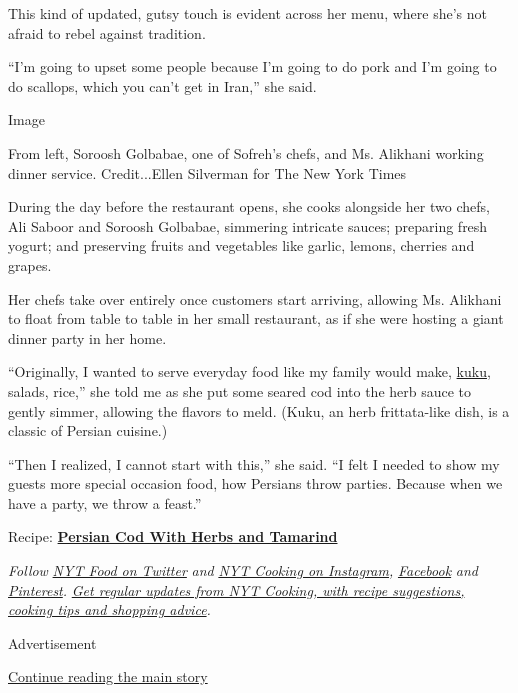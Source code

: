 This kind of updated, gutsy touch is evident across her menu, where
she's not afraid to rebel against tradition.

``I'm going to upset some people because I'm going to do pork and I'm
going to do scallops, which you can't get in Iran,'' she said.

Image

From left, Soroosh Golbabae, one of Sofreh's chefs, and Ms. Alikhani
working dinner service. Credit...Ellen Silverman for The New York Times

During the day before the restaurant opens, she cooks alongside her two
chefs, Ali Saboor and Soroosh Golbabae, simmering intricate sauces;
preparing fresh yogurt; and preserving fruits and vegetables like
garlic, lemons, cherries and grapes.

Her chefs take over entirely once customers start arriving, allowing Ms.
Alikhani to float from table to table in her small restaurant, as if she
were hosting a giant dinner party in her home.

``Originally, I wanted to serve everyday food like my family would make,
\href{https://www.nytimes3xbfgragh.onion/2016/04/08/t-magazine/food/persian-frittata-michael-pollan-samin-nosrat.html}{kuku},
salads, rice,'' she told me as she put some seared cod into the herb
sauce to gently simmer, allowing the flavors to meld. (Kuku, an herb
frittata-like dish, is a classic of Persian cuisine.)

``Then I realized, I cannot start with this,'' she said. ``I felt I
needed to show my guests more special occasion food, how Persians throw
parties. Because when we have a party, we throw a feast.''

Recipe:
\textbf{\href{https://cooking.nytimes3xbfgragh.onion/recipes/1019481-persian-cod-with-herbs-and-tamarind}{Persian
Cod With Herbs and Tamarind}}

\emph{Follow} \emph{\href{https://twitter.com/nytfood}{NYT Food on
Twitter}} \emph{and}
\emph{\href{https://www.instagram.com/nytcooking/}{NYT Cooking on
Instagram},}
\emph{\href{https://www.facebookcorewwwi.onion/nytcooking/}{Facebook}}
\emph{and}
\emph{\href{https://www.pinterest.com/nytcooking/}{Pinterest}.}
\emph{\href{https://www.nytimes3xbfgragh.onion/newsletters/cooking}{Get
regular updates from NYT Cooking, with recipe suggestions, cooking tips
and shopping advice}.}

Advertisement

\protect\hyperlink{after-bottom}{Continue reading the main story}

